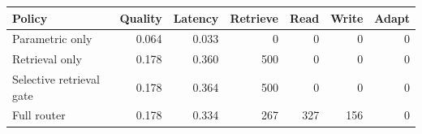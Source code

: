\begin{tabular}{lrrrrrr}
\toprule
Policy & Quality & Latency & Retrieve & Read & Write & Adapt \\
\midrule
Parametric only & 0.064 & 0.033 & 0 & 0 & 0 & 0 \\
Retrieval only & 0.178 & 0.360 & 500 & 0 & 0 & 0 \\
Selective retrieval gate & 0.178 & 0.364 & 500 & 0 & 0 & 0 \\
Full router & 0.178 & 0.334 & 267 & 327 & 156 & 0 \\
\bottomrule
\end{tabular}
